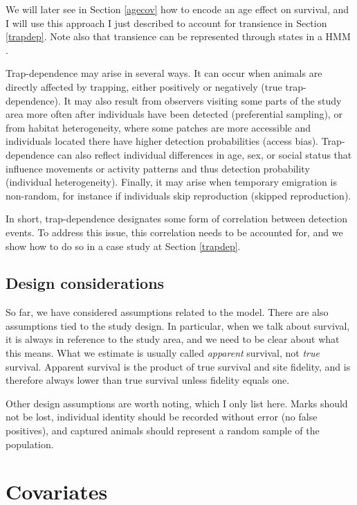 \documentclass[
  12pt,
]{krantz}
\begin{document}
We will later see in Section \ref{agecov} how to encode an age effect on survival, and I will use this approach I just described to account for transience in Section \ref{trapdep}. Note also that transience can be represented through states in a HMM \citep[see][ for more details]{genovart2019}.

Trap-dependence may arise in several ways. It can occur when animals are directly affected by trapping, either positively or negatively (true trap-dependence). It may also result from observers visiting some parts of the study area more often after individuals have been detected (preferential sampling), or from habitat heterogeneity, where some patches are more accessible and individuals located there have higher detection probabilities (access bias). Trap-dependence can also reflect individual differences in age, sex, or social status that influence movements or activity patterns and thus detection probability (individual heterogeneity). Finally, it may arise when temporary emigration is non-random, for instance if individuals skip reproduction (skipped reproduction).

In short, trap-dependence designates some form of correlation between detection events. To address this issue, this correlation needs to be accounted for, and we show how to do so in a case study at Section \ref{trapdep}.

\subsection{Design considerations}\label{design-considerations}

So far, we have considered assumptions related to the model. There are also assumptions tied to the study design. In particular, when we talk about survival, it is always in reference to the study area, and we need to be clear about what this means. What we estimate is usually called \emph{apparent} survival, not \emph{true} survival. Apparent survival is the product of true survival and site fidelity, and is therefore always lower than true survival unless fidelity equals one.

Other design assumptions are worth noting, which I only list here. Marks should not be lost, individual identity should be recorded without error (no false positives), and captured animals should represent a random sample of the population.

\section{Covariates}\label{covariates}
\end{document}
